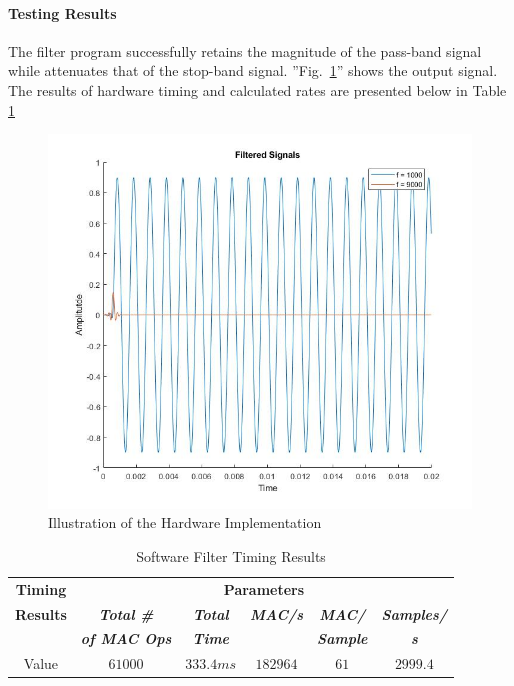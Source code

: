 \documentclass[conference]{IEEEtran}
\begin{document}
\paragraph{Testing Results} The filter program successfully retains the magnitude of the pass-band signal while attenuates that of the stop-band signal. ''Fig.~\ref{output_sin}'' shows the output signal. The results of hardware timing and calculated rates are presented below in Table \ref{software_timing}
\begin{figure}[htbp]
    \centerline{\includegraphics[width=\linewidth]{Figures/Filter/filtered_signals.jpg}}
    \caption{Illustration of the Hardware Implementation}
    \label{output_sin}
\end{figure}

\begin{table}[htbp]
\caption{Software Filter Timing Results}
\begin{center}
\begin{tabular}{|c|c|c|c|c|c|}
\hline
\textbf{Timing}&\multicolumn{5}{|c|}{\textbf{Parameters}} \\
\cline{2-6} 
\textbf{Results} & \textbf{\textit{Total \#}}& \textbf{\textit{Total}}& \textbf{\textit{MAC/s}} & \textbf{\textit{MAC/}}& \textbf{\textit{Samples/}} \\
 & \textbf{\textit{of MAC Ops}} & \textbf{\textit{Time}} & & \textbf{\textit{Sample}} & \textbf{\textit{s}} \\
\hline
Value & $61000$ & $333.4ms$ & $182964$ & $61$ & $2999.4$\\
\hline
\end{tabular}
\label{software_timing}
\end{center}
\end{table}
\end{document}
